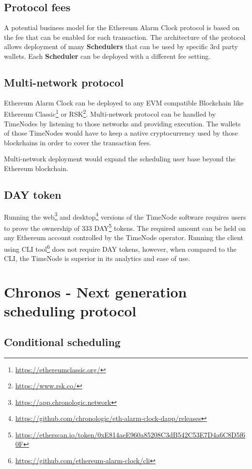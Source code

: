 \documentclass{report}
\begin{document}
  \section{Protocol fees}

  A potential business model for the Ethereum Alarm Clock protocol is based on the fee that can be enabled for each transaction. The architecture of the protocol allows deployment of many \textbf{Schedulers} that can be used by specific 3rd party wallets. Each \textbf{Scheduler} can be deployed with a different fee setting.

  \section{Multi-network protocol}

  Ethereum Alarm Clock can be deployed to any EVM compatible Blockchain like Ethereum Classic\footnote{\url{https://ethereumclassic.org/}} or RSK\footnote{\url{https://www.rsk.co/}}. Multi-network protocol can be handled by TimeNodes by listening to those networks and providing execution. The wallets of those TimeNodes would have to keep a native cryptocurrency used by those blockchains in order to cover the transaction fees.
  
  Multi-network deployment would expand the scheduling user base beyond the Ethereum blockchain.

  \section{DAY token}

  Running the web\footnote{\url{https://app.chronologic.network}} and desktop\footnote{\url{https://github.com/chronologic/eth-alarm-clock-dapp/releases}} versions of the TimeNode software requires users to prove the ownership of 333 DAY\footnote{\url{https://etherscan.io/token/0xE814aeE960a85208C3dB542C53E7D4a6C8D5f60F}} tokens. The required amount can be held on any Ethereum account controlled by the TimeNode operator. Running the client using CLI tool\footnote{\url{https://github.com/ethereum-alarm-clock/cli}} does not require DAY tokens, however, when compared to the CLI, the TimeNode is superior in its analytics and ease of use.

  \chapter{Chronos - Next generation scheduling protocol}
  \section{Conditional scheduling}
\end{document}
